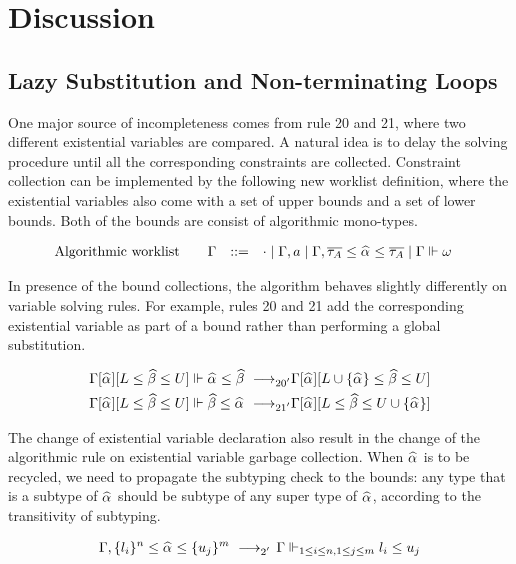 
\section{Discussion}
\subsection{Lazy Substitution and Non-terminating Loops}

One major source of incompleteness comes from rule 20 and 21,
where two different existential variables are compared.
A natural idea is to delay the solving procedure until all the corresponding
constraints are collected.
Constraint collection can be implemented by the following new worklist definition,
where the existential variables also come with a set of upper bounds
and a set of lower bounds. Both of the bounds are consist of algorithmic mono-types.

\begin{gather*}
    \begin{aligned}
        \text{Algorithmic worklist}\qquad&\Gm &::=&\quad \cdot \mid \Gm, a \mid \Gm, \overline{\tau_A} \le \al \le \overline{\tau_A} \mid \Gm \Vdash \jg
    \end{aligned}
\end{gather*}

In presence of the bound collections, the algorithm behaves slightly differently
on variable solving rules.
For example, rules 20 and 21 add the corresponding existential variable
as part of a bound rather than performing a global substitution.

\begin{gather*}
    \begin{aligned}
\Gm[\al][L \le \bt \le U] \Vdash \al \le \bt &\rrule{20'}
    \Gm[\al][L \cup \{\al\} \le \bt \le U]\\
\Gm[\al][L \le \bt \le U] \Vdash \bt \le \al &\rrule{21'}
    \Gm[\al][L \le \bt \le U \cup \{\al\}]\\
    \end{aligned}
\end{gather*}

The change of existential variable declaration also result in the change of
the algorithmic rule on existential variable garbage collection.
When $\al$ is to be recycled, we need to propagate the subtyping check to
the bounds: any type that is a subtype of $\al$ should be subtype of
any super type of $\al$, according to the transitivity of subtyping.

\begin{gather*}
    \begin{aligned}
\Gm, \{l_i\}^n \le \al \le \{u_j\}^m &\rrule{2'}
    \Gm \Vdash_{1 \le i \le n, 1 \le j \le m} l_i \le u_j\\
    \end{aligned}
\end{gather*}

